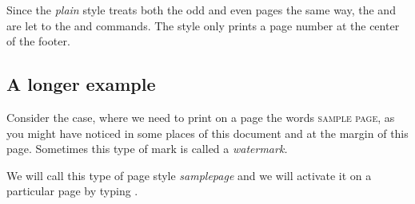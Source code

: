 
Since the \textit{plain} style treats both the odd and even pages the same way, the  and  are let to the  and  commands. The style only prints a page number at the center of the footer.


\subsection{A longer example}

\thispagestyle{samplepage}
Consider the case, where we need to print on a page the words \textsc{sample page}, as you might have noticed in some places of this document and at the margin of this page. Sometimes this type of mark is called a \textit{watermark.}

We will call this type of page style \textit{samplepage} and we will activate it on a particular page by typing .




%
%
%
%
%


